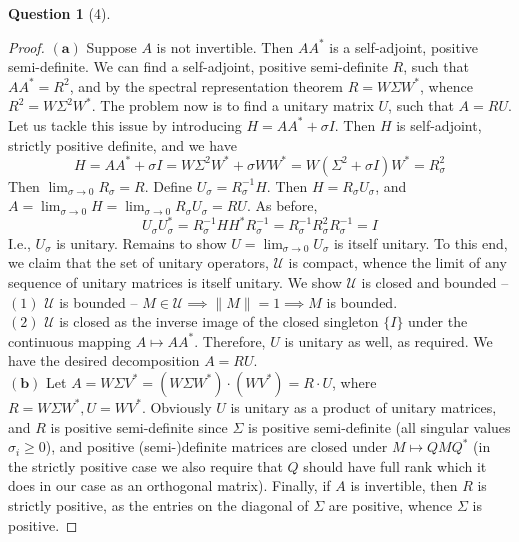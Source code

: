 \documentclass[11pt]{article}
\theoremstyle{quest}
\newtheorem*{question}{Question}
\begin{document}
\begin{question}[4]
\end{question}
\begin{proof}
$\mathbf{(a)}$ Suppose $A$ is not invertible. Then $AA^*$ is a self-adjoint, positive semi-definite. We can find a self-adjoint, positive semi-definite $R$, such that $AA^* = R^2$, and by the spectral representation theorem $R = W\Sigma W^*$, whence $R^2 = W\Sigma^2 W^*$. The problem now is to find a unitary matrix $U$, such that $A = RU$. Let us tackle this issue by introducing $H = AA^* + \sigma I$. Then $H$ is self-adjoint, strictly positive definite, and we have
$$H = AA^* + \sigma I = W\Sigma^2 W^* + \sigma WW^* = W(\Sigma^2 + \sigma I)W^* = R_{\sigma}^2$$
Then $\lim_{\sigma \rightarrow 0}R_{\sigma} = R$. Define $U_{\sigma} = R_{\sigma}^{-1}H$. Then $H = R_{\sigma}U_{\sigma}$, and $A = \lim_{\sigma \rightarrow 0} H = \lim_{\sigma \rightarrow 0} R_{\sigma}U_{\sigma} = RU$. As before,
$$U_{\sigma} U_{\sigma}^* = R_{\sigma}^{-1}H H^* R_{\sigma}^{-1} = R_{\sigma}^{-1}R_{\sigma}^2 R_{\sigma}^{-1} = I$$
I.e., $U_{\sigma}$ is unitary. Remains to show $U = \lim_{\sigma \rightarrow 0}U_{\sigma}$ is itself unitary. To this end, we claim that the set of unitary operators, $\mathscr{U}$ is compact, whence the limit of any sequence of unitary matrices is itself unitary. We show $\mathscr{U}$ is closed and bounded --
\\$(1)$ $\mathscr{U}$ is bounded -- $M \in \mathscr{U} \implies \|M\| = 1 \implies M$ is bounded.
\\$(2)$ $\mathscr{U}$ is closed as the inverse image of the closed singleton $\{I\}$ under the continuous mapping $A \mapsto AA^*$.
Therefore, $U$ is unitary as well, as required. We have the desired decomposition $A = RU$.
\\$\mathbf{(b)}$ Let $A = W\Sigma V^* = (W \Sigma W^*) \cdot (WV^*) = R \cdot U$, where $R = W \Sigma W^*, U = WV^*$. Obviously $U$ is unitary as a product of unitary matrices, and $R$ is positive semi-definite since $\Sigma$ is positive semi-definite (all singular values $\sigma_i \ge 0$), and positive (semi-)definite matrices are closed under $M \mapsto QMQ^*$ (in the strictly positive case we also require that $Q$ should have full rank which it does in our case as an orthogonal matrix). Finally, if $A$ is invertible, then $R$ is strictly positive, as the entries on the diagonal of $\Sigma$ are positive, whence $\Sigma$ is positive.
\end{proof}
\end{document}

